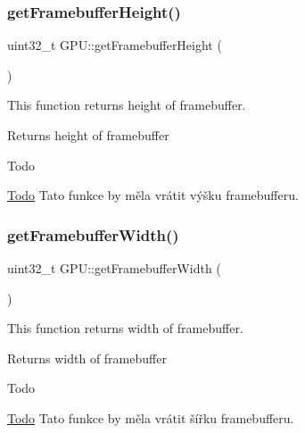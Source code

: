 \subsubsection{\texorpdfstring{get\+Framebuffer\+Height()}{getFramebufferHeight()}}
{\footnotesize\ttfamily uint32\+\_\+t G\+P\+U\+::get\+Framebuffer\+Height (\begin{DoxyParamCaption}{ }\end{DoxyParamCaption})}



This function returns height of framebuffer. 

\begin{DoxyReturn}{Returns}
height of framebuffer 
\end{DoxyReturn}
\begin{DoxyRefDesc}{Todo}
\item[\hyperlink{todo__todo000034}{Todo}]Tato funkce by měla vrátit výšku framebufferu. \end{DoxyRefDesc}
\mbox{\label{group__framebuffer__tasks_ga467b565d440e5742b7ebc104a2d70ce3}} 
\subsubsection{\texorpdfstring{get\+Framebuffer\+Width()}{getFramebufferWidth()}}
{\footnotesize\ttfamily uint32\+\_\+t G\+P\+U\+::get\+Framebuffer\+Width (\begin{DoxyParamCaption}{ }\end{DoxyParamCaption})}



This function returns width of framebuffer. 

\begin{DoxyReturn}{Returns}
width of framebuffer 
\end{DoxyReturn}
\begin{DoxyRefDesc}{Todo}
\item[\hyperlink{todo__todo000033}{Todo}]Tato funkce by měla vrátit šířku framebufferu. \end{DoxyRefDesc}
\mbox{\label{group__framebuffer__tasks_ga6391eaf70194c39bf523ddc875ca176d}} 
